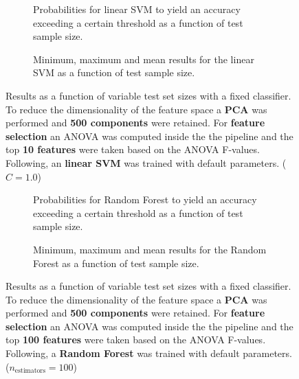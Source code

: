 \begin{figure}
    \captionsetup[subfigure]{justification=justified,singlelinecheck=false}
    \begin{subfigure}[t]{0.61\textwidth}
        
        \caption{Probabilities for linear SVM to yield an accuracy exceeding a certain threshold as a function of test sample size.}
    \end{subfigure}
    \hspace{3.0mm}
    \begin{subfigure}[t]{0.34\textwidth}
        
        \caption{Minimum, maximum and mean results for the linear SVM as a function of test sample size.}
    \end{subfigure}
    \caption[Effects of varying test sample size. Linear SVM; Preprocessing: PCA ($n_\text{components} = \num{500}$); ANOVA feature selection ($k_\text{best} = \num{10}$)]{Results as a function of variable test set sizes with a fixed classifier. To reduce the dimensionality of the feature space a \textbf{PCA} was performed and \textbf{\num{500} components} were retained. For \textbf{feature selection} an ANOVA was computed inside the the pipeline and the top \textbf{\num{10} features} were taken based on the ANOVA F-values. Following, an \textbf{{linear SVM}} was trained with default parameters. ($C=\num{1.0}$)}
    \label{fig:PCA_500_components_10_best_selected_LinearSVC}
\end{figure}

\begin{figure}
    \captionsetup[subfigure]{justification=justified,singlelinecheck=false}
    \begin{subfigure}[t]{0.61\textwidth}
        
        \caption{Probabilities for Random Forest to yield an accuracy exceeding a certain threshold as a function of test sample size.}
    \end{subfigure}
    \hspace{3.0mm}
    \begin{subfigure}[t]{0.34\textwidth}
        
        \caption{Minimum, maximum and mean results for the Random Forest as a function of test sample size.}
    \end{subfigure}
    \caption[Effects of varying test sample size. Random Forest; Preprocessing: PCA ($n_\text{components} = \num{500}$); ANOVA feature selection ($k_\text{best} = \num{100}$)]{Results as a function of variable test set sizes with a fixed classifier. To reduce the dimensionality of the feature space a \textbf{PCA} was performed and \textbf{\num{500} components} were retained. For \textbf{feature selection} an ANOVA was computed inside the the pipeline and the top \textbf{\num{100} features} were taken based on the ANOVA F-values. Following, a \textbf{{Random Forest}} was trained with default parameters. ($n_\text{estimators}=\num{100}$)}
    \label{fig:PCA_500_components_100_best_selected_RandomForest}
\end{figure}

